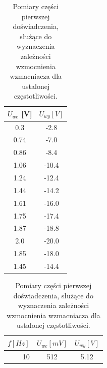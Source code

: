 \documentclass[11pt,a4paper]{article}
\begin{document}
\begin{table}[!htp]
\begin{minipage}{.4\linewidth}
\begin{center}
\begin{tabular}{|c|c|}
\hline
\multicolumn{1}{|l|}{$U_{we}$ {[}V{]}} & \multicolumn{1}{l|}{$U_{wy} [V]$} \\ \hline
0.3                                    & -2.8                              \\
0.74                                   & -7.0                                \\
0.86                                   & -8.4                              \\
1.06                                   & -10.4                             \\
1.24                                   & -12.4                             \\
1.44                                   & -14.2                             \\
1.61                                   & -16.0                               \\
1.75                                   & -17.4                             \\
1.87                                   & -18.8                             \\
2.0                                      & -20.0                               \\
1.85                                   & -18.0                               \\
1.45                                   & -14.4                             \\
\hline
\end{tabular}
\caption{Pomiary części pierwszej doświadczenia, służące do wyznaczenia zależności wzmocnienia wzmacniacza dla ustalonej częstotliwości.}
\label{czesc1} 
\end{center}
\end{minipage}
\begin{minipage}{.6\linewidth}
\begin{center}
\begin{tabular}{|r|c|c|}
\hline
\multicolumn{1}{|l|}{$f [Hz]$} & \multicolumn{1}{l|}{$U_{we} [mV]$} & \multicolumn{1}{l|}{$U_{wy} [V]$} \\ \hline
10                             & 512                                & 5.12                              \\

\end{tabular}
\end{center}
\end{minipage}
\end{table}
\end{document}
